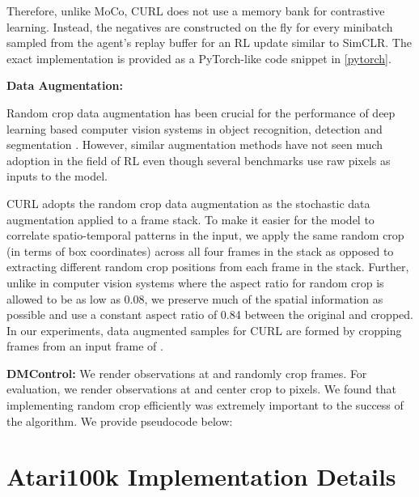 \documentclass{article}
\begin{document}
 Therefore, unlike MoCo, CURL does not use a memory bank for contrastive learning. Instead, the negatives are constructed on the fly for every minibatch sampled from the agent's replay buffer for an RL update similar to SimCLR. The exact implementation is provided as a PyTorch-like code snippet in \ref{pytorch}.


{\textbf{Data Augmentation:}}  


Random crop data augmentation has been crucial for the performance of deep learning based computer vision systems in object recognition, detection and segmentation \cite{krizhevsky2012, szegedy2015, cubuk2019, chen2020simclr}. However, similar augmentation methods have not seen much adoption in the field of RL even though several benchmarks use raw pixels as inputs to the model.

CURL adopts the random crop data augmentation as the stochastic data augmentation applied to a frame stack. To make it easier for the model to correlate spatio-temporal patterns in the input, we apply the same random crop (in terms of box coordinates) across all four frames in the stack as opposed to extracting different random crop positions from each frame in the stack. Further, unlike in computer vision systems where the aspect ratio for random crop is allowed to be as low as 0.08, we preserve much of the spatial information as possible and use a constant aspect ratio of 0.84 between the original and cropped. In our experiments, data augmented samples for CURL are formed by cropping  frames from an input frame of . 

{\textbf{DMControl:}} We render observations at  and randomly crop  frames. For evaluation, we render observations at  and center crop to  pixels. We found that implementing random crop efficiently was extremely important to the success of the algorithm. We provide pseudocode below:




\section{Atari100k Implementation Details}
\end{document}
